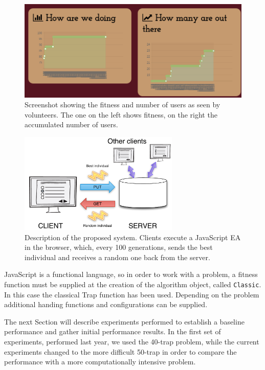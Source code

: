 \documentclass[letterpaper]{article}
\begin{document}
\begin{figure}[!t]
\centering
\includegraphics[width=0.95\linewidth]{nodio-screenshot.png}
\caption{Screenshot showing the fitness and number of users as seen by
volunteers. The one on the left shows fitness, on the right the
accumulated number of users. \label{fig:screenshot}}
\end{figure}
%
\begin{figure}[!t]
\centering
\includegraphics[width=3in]{system.pdf}
\caption{Description of the proposed system. Clients execute a JavaScript EA
  in the browser, which, every 100 generations, sends the best
  individual and receives a random one back from the server.}
\label{fig:system}
\end{figure}

JavaScript is a functional language, so in order to work with a
problem, a fitness function must be supplied at the creation of the algorithm object, 
called {\tt Classic}. In this case the classical Trap 
function \citep{Ackley1987} has been used. Depending on the
problem additional handing functions and configurations 
can be supplied. 

The next Section will describe experiments performed to
establish a baseline performance and gather initial performance
results. In the first set of experiments, performed last year, we used the 40-trap
problem, while the current experiments changed to the more difficult 50-trap
in order to compare the performance with a more computationally intensive problem.
\end{document}

